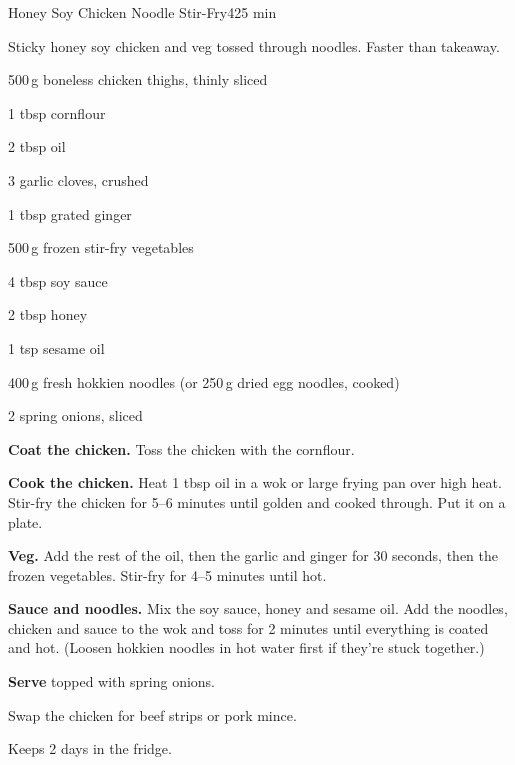 \begin{recipebox}{Honey Soy Chicken Noodle Stir-Fry}{4}{25 min}

Sticky honey soy chicken and veg tossed through noodles. Faster than takeaway.

\begin{ingredients}
  \item 500\,g boneless chicken thighs, thinly sliced
  \item 1 tbsp cornflour
  \item 2 tbsp oil
  \item 3 garlic cloves, crushed
  \item 1 tbsp grated ginger
  \item 500\,g frozen stir-fry vegetables
  \item 4 tbsp soy sauce
  \item 2 tbsp honey
  \item 1 tsp sesame oil
  \item 400\,g fresh hokkien noodles (or 250\,g dried egg noodles, cooked)
  \item 2 spring onions, sliced
\end{ingredients}

\begin{method}
  \item \textbf{Coat the chicken.} Toss the chicken with the cornflour.
  \item \textbf{Cook the chicken.} Heat 1 tbsp oil in a wok or large frying pan over
        high heat. Stir-fry the chicken for 5--6 minutes until golden and cooked
        through. Put it on a plate.
  \item \textbf{Veg.} Add the rest of the oil, then the garlic and ginger for 30
        seconds, then the frozen vegetables. Stir-fry for 4--5 minutes until hot.
  \item \textbf{Sauce and noodles.} Mix the soy sauce, honey and sesame oil. Add the
        noodles, chicken and sauce to the wok and toss for 2 minutes until
        everything is coated and hot. (Loosen hokkien noodles in hot water first
        if they're stuck together.)
  \item \textbf{Serve} topped with spring onions.
\end{method}

\begin{notelist}
  \item Swap the chicken for beef strips or pork mince.
  \item Keeps 2 days in the fridge.
\end{notelist}

\end{recipebox}
